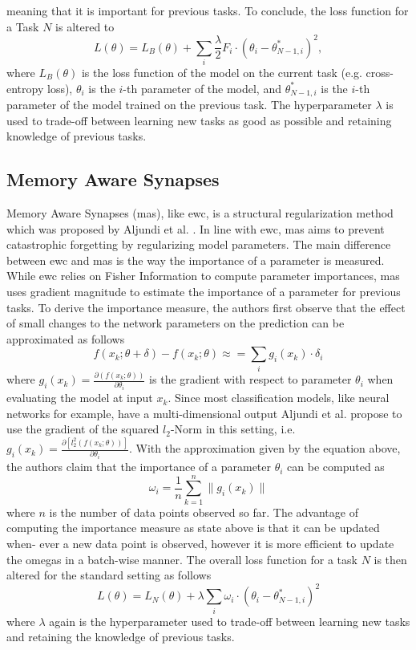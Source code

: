 meaning that it is important for previous tasks. To conclude, the loss function for a Task $N$ is altered to
\begin{equation}
    L(\theta) = L_B(\theta) + \sum_i \frac{\lambda}{2} F_i \cdot (\theta_i - \theta^*_{N-1,i})^2,
\end{equation}
where $L_B(\theta)$ is the loss function of the model on the current task (e.g. cross-entropy loss), $\theta_i$ is the $i$-th parameter of the model,
and $\theta^*_{N-1,i}$ is the $i$-th parameter of the model trained on the previous task. The hyperparameter $\lambda$ is used to trade-off between
learning new tasks as good as possible and retaining knowledge of previous tasks.

\subsection{Memory Aware Synapses}
\label{sec:Related_work:Continual_Learning:MAS}
Memory Aware Synapses (\gls{mas}), like \gls{ewc}, is a structural regularization method which was proposed by Aljundi et al. \cite{aljundi2018memory}. 
In line with \gls{ewc}, \gls{mas} aims to prevent catastrophic forgetting by regularizing model parameters. The main difference between \gls{ewc} and
\gls{mas} is the way the importance of a parameter is measured. While \gls{ewc} relies on Fisher Information to compute parameter importances, \gls{mas} uses
gradient magnitude to estimate the importance of a parameter for previous tasks. To derive the importance measure, the authors first observe that the
effect of small changes to the network parameters on the prediction can be approximated as follows
\begin{equation}
    f(x_k; \theta + \delta) - f(x_k; \theta) \approx = \sum_i g_i(x_k) \cdot \delta_i
\end{equation}
where $g_i(x_k) = \frac{\partial(f(x_k;\theta))}{\partial \theta_i}$  is the gradient with respect to parameter $\theta_i$ when evaluating the model at
input $x_k$. Since most classification models, like neural networks for example, have a multi-dimensional output Aljundi et al. propose to use the gradient
of the squared $l_2$-Norm in this setting, i.e. $g_i(x_k) =  \frac{\partial[l^2_2(f(x_k;\theta))]}{\partial \theta_i}$. With the approximation given by the
equation above, the authors claim that the importance of a parameter $\theta_i$ can be computed as
\begin{equation}
    \omega_i = \frac{1}{n} \sum_{k=1}^n \lVert g_i(x_k) \rVert
\end{equation}
where $n$ is the number of data points observed so far. The advantage of computing the importance measure as state above is that it can be updated when-
ever a new data point is observed, however it is more efficient to update the omegas in a batch-wise manner. The overall loss function for a task $N$ is
then altered for the standard setting as follows
\begin{equation}
    L(\theta) = L_N(\theta) + \lambda \sum_i \omega_i \cdot (\theta_i - \theta^*_{N-1,i})^2
\end{equation}
where $\lambda$ again is the hyperparameter used to trade-off between learning new tasks and retaining the knowledge of previous tasks.

